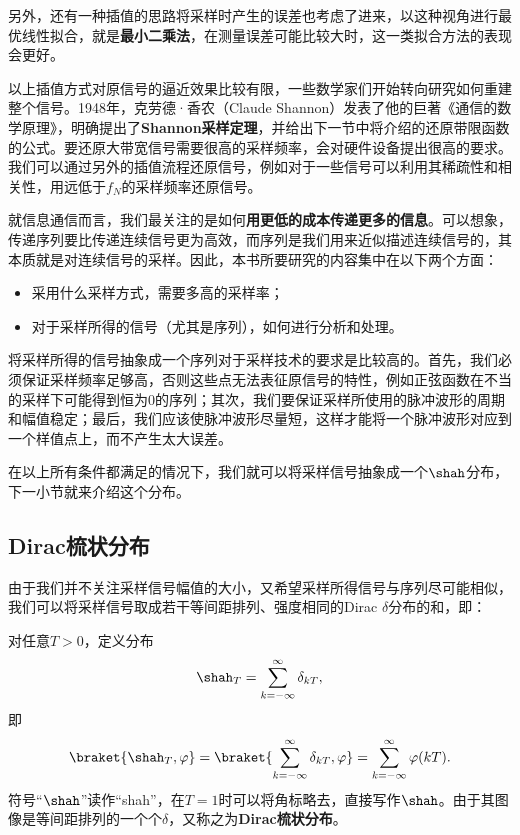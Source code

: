 另外，还有一种插值的思路将采样时产生的误差也考虑了进来，以这种视角进行最优线性拟合，就是\textbf{最小二乘法}，在测量误差可能比较大时，这一类拟合方法的表现会更好。

以上插值方式对原信号的逼近效果比较有限，一些数学家们开始转向研究如何重建整个信号。1948年，克劳德·香农（Claude Shannon）发表了他的巨著《通信的数学原理》，明确提出了\textbf{Shannon采样定理}，并给出下一节中将介绍的还原带限函数的公式。要还原大带宽信号需要很高的采样频率，会对硬件设备提出很高的要求。我们可以通过另外的插值流程还原信号，例如对于一些信号可以利用其稀疏性和相关性，用远低于$f_N$的采样频率还原信号。

就信息通信而言，我们最关注的是如何\textbf{用更低的成本传递更多的信息}。可以想象，传递序列要比传递连续信号更为高效，而序列是我们用来近似描述连续信号的，其本质就是对连续信号的采样。因此，本书所要研究的内容集中在以下两个方面：
\begin{itemize}
    \item 采用什么采样方式，需要多高的采样率；
    \item 对于采样所得的信号（尤其是序列），如何进行分析和处理。
\end{itemize}

将采样所得的信号抽象成一个序列对于采样技术的要求是比较高的。首先，我们必须保证采样频率足够高，否则这些点无法表征原信号的特性，例如正弦函数在不当的采样下可能得到恒为$0$的序列；其次，我们要保证采样所使用的脉冲波形的周期和幅值稳定；最后，我们应该使脉冲波形尽量短，这样才能将一个脉冲波形对应到一个样值点上，而不产生太大误差。

在以上所有条件都满足的情况下，我们就可以将采样信号抽象成一个$\shah$分布，下一小节就来介绍这个分布。

\subsection{Dirac梳状分布}\label{sub:dirac_comb}
由于我们并不关注采样信号幅值的大小，又希望采样所得信号与序列尽可能相似，我们可以将采样信号取成若干等间距排列、强度相同的Dirac $\delta$分布的和，即：
\begin{definition}[Dirac梳状分布]\label{def:shah}
    对任意$T>0$，定义分布
    \begin{equation}
        \shah_T=\sum_{k=-\infty}^{\infty}\delta_{kT},
    \end{equation}
    即
    \begin{equation}
        \braket{\shah_T,\varphi}=\braket{\sum_{k=-\infty}^{\infty}\delta_{kT},\varphi}=\sum_{k=-\infty}^{\infty}\varphi(kT).
    \end{equation}
    符号“$\shah$”读作“shah”，在$T=1$时可以将角标略去，直接写作$\shah$\cite{brad_osgood_ee261}。由于其图像是等间距排列的一个个$\delta$，又称之为\textbf{Dirac梳状分布}。
\end{definition}

